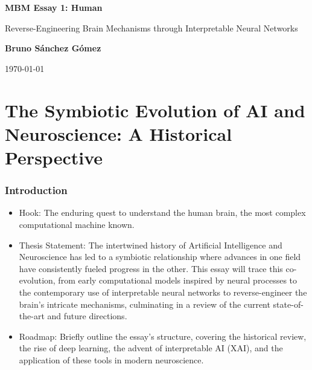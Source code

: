 \documentclass[11pt,a4paper]{article}
\author{Bruno Sánchez Gómez}
\date{\today}
\begin{document}
\begin{titlepage}
    \centering
    \vspace*{2cm}
    {\Huge \bfseries MBM Essay 1: Human \par}
    \vspace{2cm}
    {\Large {\Huge Reverse-Engineering Brain Mechanisms through Interpretable Neural Networks} \par}
    \vspace{8cm}
    {\large \textbf{Bruno Sánchez Gómez} \par}
    \vfill
    {\large \today \par}
\end{titlepage}


\part{The Symbiotic Evolution of AI and Neuroscience: A Historical Perspective}

\section{Introduction}
\begin{itemize}
    \item Hook: The enduring quest to understand the human brain, the most complex computational machine known.
    \item Thesis Statement: The intertwined history of Artificial Intelligence and Neuroscience has led to a symbiotic relationship where advances in one field have consistently fueled progress in the other. This essay will trace this co-evolution, from early computational models inspired by neural processes to the contemporary use of interpretable neural networks to reverse-engineer the brain's intricate mechanisms, culminating in a review of the current state-of-the-art and future directions.
    \item Roadmap: Briefly outline the essay's structure, covering the historical review, the rise of deep learning, the advent of interpretable AI (XAI), and the application of these tools in modern neuroscience.
\end{itemize}
\end{document}
